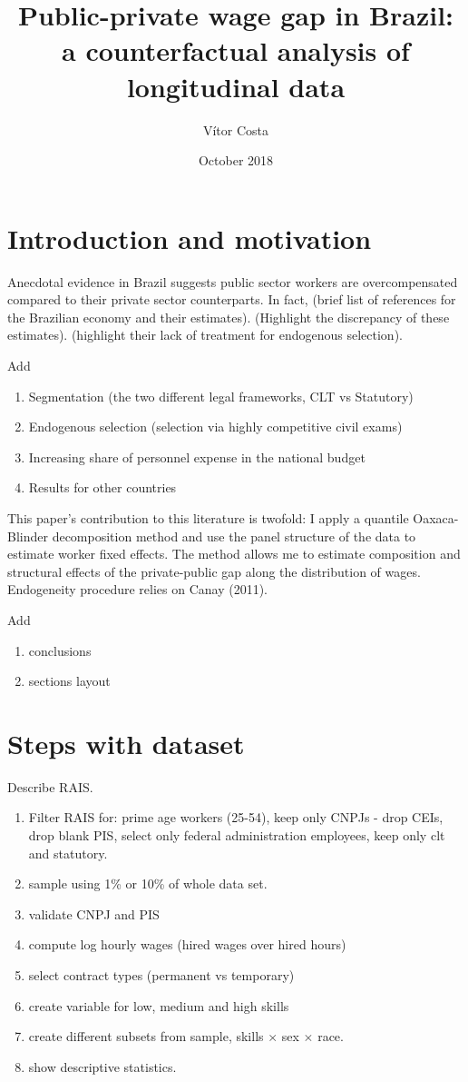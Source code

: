 \documentclass{article}
\title{Public-private wage gap in Brazil: a counterfactual analysis of longitudinal data}
\author{Vítor Costa}
\date{October 2018}
\begin{document}
\maketitle

\section{Introduction and motivation}
Anecdotal evidence in Brazil suggests public sector workers are overcompensated compared to their private sector counterparts. In fact, (brief list of references for the Brazilian economy and their estimates). (Highlight the discrepancy of these estimates). (highlight their lack of treatment for endogenous selection).

Add
\begin{enumerate}
    \item Segmentation (the two different legal frameworks, CLT vs Statutory)
    \item Endogenous selection (selection via highly competitive civil exams)
    \item Increasing share of personnel expense in the national budget 
    \item Results for other countries
\end{enumerate}


This paper's contribution to this literature is twofold: I apply a quantile Oaxaca-Blinder decomposition method and use the panel structure of the data to estimate worker fixed effects. The method allows me to estimate composition and structural effects of the private-public gap along the distribution of wages. Endogeneity procedure relies on Canay (2011).  

Add 
\begin{enumerate}
    \item conclusions
    \item sections layout 
\end{enumerate}

\section{Steps with dataset}
Describe RAIS. 

\begin{enumerate}
    \item Filter RAIS for: prime age workers (25-54), keep only CNPJs - drop CEIs, drop blank PIS, select only federal administration employees, keep only clt and statutory.
    \item sample using 1\% or 10\% of whole data set.  
    \item validate CNPJ and PIS
    \item compute log hourly wages (hired wages over hired hours)
    \item select contract types (permanent vs temporary)
    \item create variable for low, medium and high skills
    \item create different subsets from sample, skills $\times$ sex $\times$ race.
    \item show descriptive statistics.
\end{enumerate}
\end{document}
